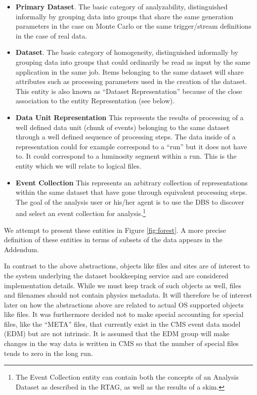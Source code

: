 \documentclass{cmspaper}
\begin{document}
\begin{itemize}
\item {\bf Primary Dataset}. The basic category of analyzability, distinguished informally 
by grouping data into groups that share the same generation parameters in the case on Monte
Carlo or the same trigger/stream definitions in the case of real data.
\item {\bf Dataset}. The basic category of homogeneity, distinguished informally 
by grouping data into groups that could ordinarily be read as input by the same application 
in the same job.  Items belonging to the same dataset will share attributes such as 
processing parameters used in the creation of the dataset. This entity is also known as 
``Dataset Representation'' because of the close association to the entity 
Representation (see below). 
\item{\bf Data Unit Representation}
 This represents the results of processing of a well defined data unit 
(chunk of events) belonging to the same dataset through a well defined sequence of processing steps.
The data inside of a representation could for example correspond to a ``run'' but it 
does not have to.  It could correspond to a luminosity segment within a run.  This is 
the entity which we will relate to logical files.
\item {\bf Event Collection} This represents an arbitrary collection of representations within 
the same dataset that have gone through equivalent processing steps.  The goal of the 
analysis user or his/her agent is to use the DBS to discover and select an event 
collection for analysis.\footnote{The Event Collection entity can contain both the concepts of 
an Analysis Dataset as described in the RTAG, as well as the results of a skim.}
\end{itemize}

We attempt to present these entities in Figure \ref{fig:forest}.  A more precise definition
of these entities in terms of subsets of the data appears in the Addendum.

In contrast to the above abstractions, objects like files and sites are 
of interest to the system underlying the dataset bookkeeping service and are considered 
implementation details.  While we must keep track of such objects as well, 
files and filenames should not contain physics metadata.  It will therefore
be of interest later on how the abstractions above are related to actual OS 
supported objects like files.  It was furthermore decided not to make special 
accounting for special files, like the ``META'' files, that currently exist in the 
CMS event data model (EDM) but are not intrinsic.  It is assumed that the EDM group will 
make changes in the way data is written in CMS so that the number of special files tends 
to zero in the long run.  
\end{document}
